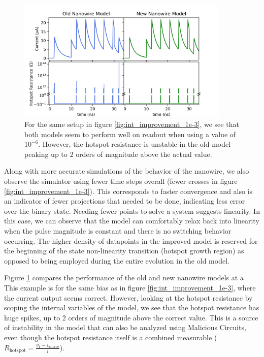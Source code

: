 \begin{figure}
    \centering
    \includegraphics[width=0.9\textwidth]{figs/int_improvement_1e-6.png}
    \caption{For the same setup in figure \ref{fig:int_improvement_1e-3}, we see
    that both models seem to perform well on readout when using a  value
    of $10^{-6}$. However, the hotspot resistance is unstable in the old model peaking
    up to $2$ orders of magnitude above the actual value.}
    \label{fig:int_improvement_1e-6}
\end{figure}

Along with more accurate simulations of the behavior of the nanowire, we also
observe the simulator using fewer time steps overall (fewer crosses in figure 
\ref{fig:int_improvement_1e-3}). This corresponds to faster convergence and also is
an indicator of fewer projections that needed to be done, indicating less
error over the binary state. Needing fewer points to solve a system suggests
linearity. In this case, we can observe that the model can comfortably relax
back into linearity when the pulse magnitude is constant and there is no
switching behavior occurring. The higher density of datapoints in the improved model 
is reserved for the beginning of the state non-linearity transition (hotspot growth region)
as opposed to being employed during the entire evolution in the old model.

Figure \ref{fig:int_improvement_1e-6} compares the performance of the old and new 
nanowire models at a . This example is for the same bias as in 
figure \ref{fig:int_improvement_1e-3}, where the current output seems correct.
However, looking at the hotspot resistance by scoping the internal variables of the 
model, we see that the hotspot resistance has huge spikes, up to 2 orders of magnitude
above the correct value. This is a source of instability in the model that can also
be analyzed using Malicious Circuits, even though the hotspot resistance itself is
a combined measurable ($R_{\mathrm{hotspot}} = \frac{v_1 - v_{\mathrm{source}}}{i}$).

